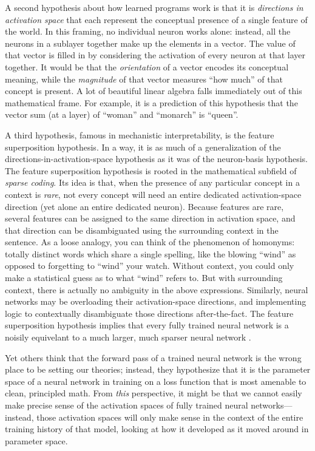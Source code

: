 A second hypothesis about how learned programs work is that it is
\emph{directions in activation space} that each represent the conceptual
presence of a single feature of the world. In this framing, no individual
neuron works alone: instead, all the neurons in a sublayer together make up the
elements in a vector. The value of that vector is filled in by considering the
activation of every neuron at that layer together. It would be that the
\emph{orientation} of a vector encodes its conceptual meaning, while the
\emph{magnitude} of that vector measures ``how much'' of that concept is
present. A lot of beautiful linear algebra falls immediately out of this
mathematical frame. For example, it is a prediction of this hypothesis that the
vector sum (at a layer) of ``woman'' and ``monarch'' is ``queen''.

A third hypothesis, famous in mechanistic interpretability, is the feature
superposition hypothesis. In a way, it is as much of a generalization of the
directions-in-activation-space hypothesis as it was of the neuron-basis
hypothesis. The feature superposition hypothesis is rooted in the mathematical
subfield of \emph{sparse coding}. Its idea is that, when the presence of any
particular concept in a context is \emph{rare}, not every concept will need an
entire dedicated activation-space direction (yet alone an entire dedicated
neuron). Because features are rare, several features can be assigned to the
same direction in activation space, and that direction can be disambiguated
using the surrounding context in the sentence. As a loose analogy, you can
think of the phenomenon of homonyms: totally distinct words which share a
single spelling, like the blowing ``wind'' as opposed to forgetting to ``wind''
your watch. Without context, you could only make a statistical guess as to what
``wind'' refers to. But with surrounding context, there is actually no
ambiguity in the above expressions. Similarly, neural networks may be
overloading their activation-space directions, and implementing logic to
contextually disambiguate those directions after-the-fact. The feature
superposition hypothesis implies that every fully trained neural network is a
noisily equivelant to a much larger, much sparser neural network
\cite{elhage2022superposition}.

Yet others think that the forward pass of a trained neural network is the wrong
place to be setting our theories; instead, they hypothesize that it is the
parameter space of a neural network in training on a loss function that is most
amenable to clean, principled math. From \emph{this} perspective, it might be
that we cannot easily make precise sense of the activation spaces of fully
trained neural networks---instead, those activation spaces will only make sense
in the context of the entire training history of that model, looking at how it
developed as it moved around in parameter space.

